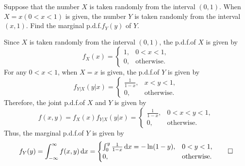 \begin{example}
  Suppose that the number \(X\) is taken randomly from the interval \((0, 1)\). When \(X = x (0 < x < 1)\) is given, the number \(Y\) is taken randomly from the interval \((x, 1)\). Find the marginal p.d.f.\@ \(f_Y(y)\) of \(Y\).
\end{example}
\begin{solution}
  Since \(X\) is taken randomly from the interval \((0, 1)\), the p.d.f.\@ of \(X\) is given by
  \[
    f_X(x) = \begin{cases}
      1, & 0 < x < 1, \\
      0, & \text{otherwise}.
    \end{cases}
  \]
  For any \(0 < x < 1\), when \(X = x\) is given, the p.d.f.\@ of \(Y\) is given by
  \[
    f_{Y|X}(y | x) = \begin{cases}
      \frac{1}{1 - x}, & x < y < 1, \\
      0, & \text{otherwise}.
    \end{cases}
  \]
  Therefore, the joint p.d.f.\@ of \(X\) and \(Y\) is given by
  \[
    f(x, y) = f_X(x) f_{Y|X}(y | x) = \begin{cases}
      \frac{1}{1 - x}, & 0 < x < y < 1, \\
      0, & \text{otherwise}.
    \end{cases}
  \]
  Thus, the marginal p.d.f.\@ of \(Y\) is given by
  \[
    f_Y(y) = \int_{-\infty}^\infty f(x, y) \, \mathrm{d} x = \begin{cases}
      \int_0^y \frac{1}{1 - x} \, \mathrm{d} x = -\ln(1 - y), & 0 < y < 1, \\
      0, & \text{otherwise}.
    \end{cases} \qedhere
  \]
\end{solution}

